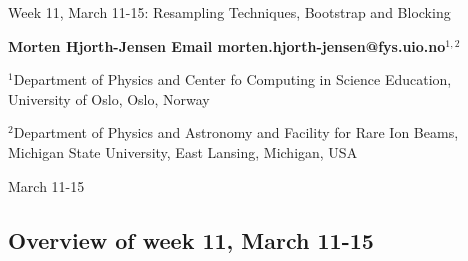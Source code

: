 \documentclass[%
oneside,                 %
final,                   %
10pt]{article}
\begin{document}

\newcommand{\exercisesection}[1]{\subsection*{#1}}






\thispagestyle{empty}

\begin{center}
{\LARGE\bf
\begin{spacing}{1.25}
Week 11, March 11-15: Resampling Techniques, Bootstrap and Blocking
\end{spacing}
}
\end{center}


\begin{center}
{\bf Morten Hjorth-Jensen  Email morten.hjorth-jensen@fys.uio.no${}^{1, 2}$} \\ [0mm]
\end{center}

\begin{center}
\centerline{{\small ${}^1$Department of Physics and Center fo Computing in Science Education, University of Oslo, Oslo, Norway}}
\centerline{{\small ${}^2$Department of Physics and Astronomy and Facility for Rare Ion Beams, Michigan State University, East Lansing, Michigan, USA}}
\end{center}
    

\begin{center}
March 11-15
\end{center}

\vspace{1cm}


\subsection*{Overview of week 11, March 11-15}

\end{document}
